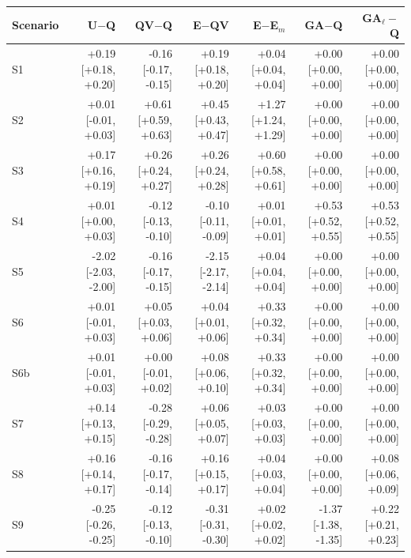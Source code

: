 \begin{tabular}{@{}lrrrrrr@{}}
\toprule
Scenario & U$-$Q & QV$-$Q & E$-$QV & E$-$E$_m$ & GA$-$Q & GA$_\ell-$Q \\
\midrule
S1 & +0.19 [+0.18, +0.20] & -0.16 [-0.17, -0.15] & +0.19 [+0.18, +0.20] & +0.04 [+0.04, +0.04] & +0.00 [+0.00, +0.00] & +0.00 [+0.00, +0.00] \\
S2 & +0.01 [-0.01, +0.03] & +0.61 [+0.59, +0.63] & +0.45 [+0.43, +0.47] & +1.27 [+1.24, +1.29] & +0.00 [+0.00, +0.00] & +0.00 [+0.00, +0.00] \\
S3 & +0.17 [+0.16, +0.19] & +0.26 [+0.24, +0.27] & +0.26 [+0.24, +0.28] & +0.60 [+0.58, +0.61] & +0.00 [+0.00, +0.00] & +0.00 [+0.00, +0.00] \\
S4 & +0.01 [+0.00, +0.03] & -0.12 [-0.13, -0.10] & -0.10 [-0.11, -0.09] & +0.01 [+0.01, +0.01] & +0.53 [+0.52, +0.55] & +0.53 [+0.52, +0.55] \\
S5 & -2.02 [-2.03, -2.00] & -0.16 [-0.17, -0.15] & -2.15 [-2.17, -2.14] & +0.04 [+0.04, +0.04] & +0.00 [+0.00, +0.00] & +0.00 [+0.00, +0.00] \\
S6 & +0.01 [-0.01, +0.03] & +0.05 [+0.03, +0.06] & +0.04 [+0.01, +0.06] & +0.33 [+0.32, +0.34] & +0.00 [+0.00, +0.00] & +0.00 [+0.00, +0.00] \\
S6b & +0.01 [-0.01, +0.03] & +0.00 [-0.01, +0.02] & +0.08 [+0.06, +0.10] & +0.33 [+0.32, +0.34] & +0.00 [+0.00, +0.00] & +0.00 [+0.00, +0.00] \\
S7 & +0.14 [+0.13, +0.15] & -0.28 [-0.29, -0.28] & +0.06 [+0.05, +0.07] & +0.03 [+0.03, +0.03] & +0.00 [+0.00, +0.00] & +0.00 [+0.00, +0.00] \\
S8 & +0.16 [+0.14, +0.17] & -0.16 [-0.17, -0.14] & +0.16 [+0.15, +0.17] & +0.04 [+0.03, +0.04] & +0.00 [+0.00, +0.00] & +0.08 [+0.06, +0.09] \\
S9 & -0.25 [-0.26, -0.25] & -0.12 [-0.13, -0.10] & -0.31 [-0.31, -0.30] & +0.02 [+0.02, +0.02] & -1.37 [-1.38, -1.35] & +0.22 [+0.21, +0.23] \\
\bottomrule
\end{tabular}